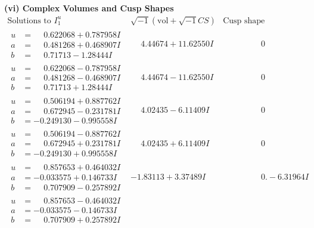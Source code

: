 \documentclass[1p]{elsarticle_modified}
\theoremstyle{definition}
\newcommand{\I}{\sqrt{-1}}
\begin{document}
\newpage\flushleft \textbf{(vi) Complex Volumes and Cusp Shapes}
$$\begin{array}{c|c|c}  
\text{Solutions to }I^u_{1}& \I (\text{vol} + \sqrt{-1}CS) & \text{Cusp shape}\\
 \hline 
\begin{aligned}
u &= \phantom{-}0.622068 + 0.787958 I \\
a &= \phantom{-}0.481268 + 0.468907 I \\
b &= \phantom{-}0.71713 - 1.28444 I\end{aligned}
 & \phantom{-}4.44674 + 11.62550 I & \phantom{-0.000000 } 0 \\ \hline\begin{aligned}
u &= \phantom{-}0.622068 - 0.787958 I \\
a &= \phantom{-}0.481268 - 0.468907 I \\
b &= \phantom{-}0.71713 + 1.28444 I\end{aligned}
 & \phantom{-}4.44674 - 11.62550 I & \phantom{-0.000000 } 0 \\ \hline\begin{aligned}
u &= \phantom{-}0.506194 + 0.887762 I \\
a &= \phantom{-}0.672945 - 0.231781 I \\
b &= -0.249130 - 0.995558 I\end{aligned}
 & \phantom{-}4.02435 - 6.11409 I & \phantom{-0.000000 } 0 \\ \hline\begin{aligned}
u &= \phantom{-}0.506194 - 0.887762 I \\
a &= \phantom{-}0.672945 + 0.231781 I \\
b &= -0.249130 + 0.995558 I\end{aligned}
 & \phantom{-}4.02435 + 6.11409 I & \phantom{-0.000000 } 0 \\ \hline\begin{aligned}
u &= \phantom{-}0.857653 + 0.464032 I \\
a &= -0.033575 + 0.146733 I \\
b &= \phantom{-}0.707909 - 0.257892 I\end{aligned}
 & -1.83113 + 3.37489 I & \phantom{-0.000000 } 0. - 6.31964 I \\ \hline\begin{aligned}
u &= \phantom{-}0.857653 - 0.464032 I \\
a &= -0.033575 - 0.146733 I \\
b &= \phantom{-}0.707909 + 0.257892 I\end{aligned}

\end{array}$$
\end{document}
